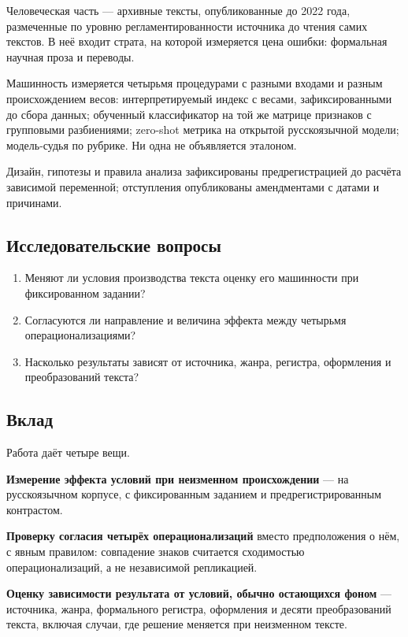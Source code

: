 \documentclass[11pt,a4paper]{article}
\renewcommand{\_}{\textunderscore\allowbreak}
\begin{document}
Человеческая часть — архивные тексты, опубликованные до 2022 года, размеченные по
уровню регламентированности источника до чтения самих текстов. В неё входит
страта, на которой измеряется цена ошибки: формальная научная проза и переводы.

Машинность измеряется четырьмя процедурами с разными входами и разным
происхождением весов: интерпретируемый индекс с весами, зафиксированными до сбора
данных; обученный классификатор на той же матрице признаков с групповыми
разбиениями; zero-shot метрика на открытой русскоязычной модели; модель-судья по
рубрике. Ни одна не объявляется эталоном.

Дизайн, гипотезы и правила анализа зафиксированы предрегистрацией до расчёта
зависимой переменной; отступления опубликованы амендментами с датами и причинами.

\subsection{Исследовательские вопросы}

\begin{enumerate}
\item[1.] Меняют ли условия производства текста оценку его машинности при фиксированном
   задании?
\item[2.] Согласуются ли направление и величина эффекта между четырьмя
   операционализациями?
\item[3.] Насколько результаты зависят от источника, жанра, регистра, оформления и
   преобразований текста?
\end{enumerate}

\subsection{Вклад}

Работа даёт четыре вещи.

\textbf{Измерение эффекта условий при неизменном происхождении} — на русскоязычном
корпусе, с фиксированным заданием и предрегистрированным контрастом.

\textbf{Проверку согласия четырёх операционализаций} вместо предположения о нём, с
явным правилом: совпадение знаков считается сходимостью операционализаций, а не
независимой репликацией.

\textbf{Оценку зависимости результата от условий, обычно остающихся фоном} — источника,
жанра, формального регистра, оформления и десяти преобразований текста, включая
случаи, где решение меняется при неизменном тексте.
\end{document}
